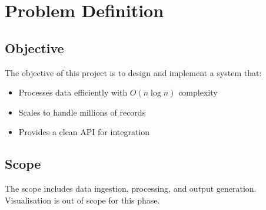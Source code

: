 \chapter{Problem Definition}

\section{Objective}
The objective of this project is to design and implement a system that:
\begin{itemize}
    \item Processes data efficiently with $O(n \log n)$ complexity
    \item Scales to handle millions of records
    \item Provides a clean API for integration
\end{itemize}

\section{Scope}
The scope includes data ingestion, processing, and output generation. Visualisation is
out of scope for this phase.
